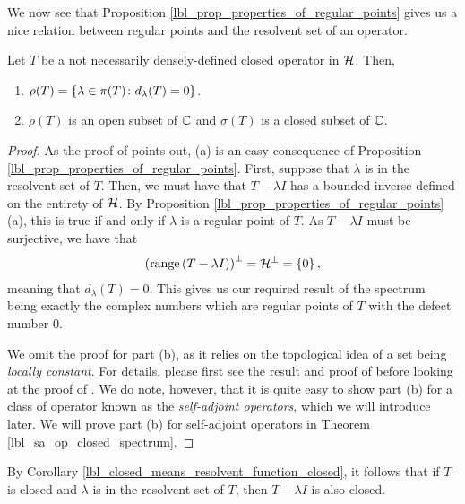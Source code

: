 We now see that Proposition \eqref{lbl_prop_properties_of_regular_points} gives us a nice relation between regular points and the resolvent set of an operator.

\begin{proposition}\label{lbl_resolvent_and_regular_point_relation}
  Let $T$ be a not necessarily densely-defined closed operator in $\mathcal{H}$. Then,
  \begin{enumerate}[label = (\alph*)]
    \item $\rho(T) = \left\{\lambda \in \pi(T) \colon d_\lambda(T) = 0\right\}$.
    \item $\rho(T)$ is an open subset of $\mathbb{C}$ and $\sigma(T)$ is a closed subset of $\mathbb{C}$.
  \end{enumerate}
\end{proposition}
\begin{proof}
  As the proof of {\cite[Proposition 2.6]{konrad}} points out, (a) is an easy consequence of Proposition \eqref{lbl_prop_properties_of_regular_points}. First, suppose that $\lambda$ is in the resolvent set of $T$. Then, we must have that $T - \lambda I$ has a bounded inverse defined on the entirety of $\mathcal{H}$. By Proposition \eqref{lbl_prop_properties_of_regular_points}(a), this is true if and only if $\lambda$ is a regular point of $T$. As $T - \lambda I$ must be surjective, we have that
  \begin{align*}
    \left( \operatorname{range}\left(T - \lambda I\right) \right)^\perp = \mathcal{H}^\perp = \left\{0\right\},
  \end{align*}
  meaning that $d_\lambda(T) = 0$. This gives us our required result of the spectrum being exactly the complex numbers which are regular points of $T$ with the defect number 0.

  \medskip

  We omit the proof for part (b), as it relies on the topological idea of a set being {\emph{locally constant}}. For details, please first see the result and proof of {\cite[2.4]{konrad}} before looking at the proof of {\cite[Proposition 2.6]{konrad}}. We do note, however, that it is quite easy to show part (b) for a class of operator known as the {\emph{self-adjoint operators}}, which we will introduce later. We will prove part (b) for self-adjoint operators in Theorem \eqref{lbl_sa_op_closed_spectrum}.
\end{proof}

\begin{remark}
  By Corollary \eqref{lbl_closed_means_resolvent_function_closed}, it follows that if $T$ is closed and $\lambda$ is in the resolvent set of $T$, then $T - \lambda I$ is also closed.
\end{remark}

